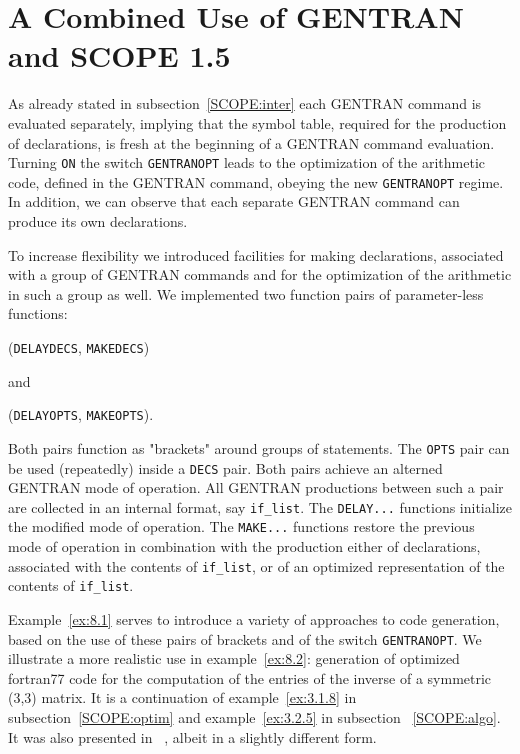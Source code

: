 \section{A Combined Use of GENTRAN and SCOPE 1.5}\label{SCOPE:gopt}

As already stated in subsection~\ref{SCOPE:inter} each GENTRAN command is 
evaluated separately, implying that the symbol table, required 
for the production of declarations, is fresh at the beginning of a GENTRAN 
command evaluation. Turning {\tt ON} the switch {\tt GENTRANOPT} leads to
the optimization of the arithmetic code, defined in  the GENTRAN command,
obeying the new {\tt GENTRANOPT} regime. In addition, we can observe that 
each separate GENTRAN command can produce its own declarations.

To increase flexibility we introduced facilities for making declarations,
associated with a group of GENTRAN commands and for the optimization of
the arithmetic in such a group as well.
We implemented two function pairs of parameter-less functions:

\hspace{1cm} ({\tt DELAYDECS}, {\tt MAKEDECS})

and 

\hspace{1cm} ({\tt DELAYOPTS}, {\tt MAKEOPTS}).

Both pairs function as "brackets" around groups of statements. The {\tt OPTS}
pair can be used (repeatedly) inside a {\tt DECS} pair. Both pairs achieve
an alterned GENTRAN mode of operation. All GENTRAN productions between such
a pair are collected in an internal format, say {\tt if\_list}. 
The {\tt DELAY...} functions initialize the modified mode of operation. 
The {\tt MAKE...} functions restore the previous mode of operation in 
combination with the production either of declarations, associated with the
contents of {\tt if\_list}, or of an optimized representation  of the
contents of {\tt if\_list}.

Example~\ref{ex:8.1} serves to introduce a variety of approaches to code 
generation, based on the use of these pairs of brackets and of the 
switch {\tt GENTRANOPT}. We illustrate a more realistic use in 
example~\ref{ex:8.2}: generation of optimized fortran77 code for the 
computation of the entries of the inverse of a symmetric (3,3) matrix. 
It is a continuation of example~\ref{ex:3.1.8} in 
subsection~\ref{SCOPE:optim} and example~\ref{ex:3.2.5} in 
subsection ~\ref{SCOPE:algo}. It was also presented 
in ~\cite{Gates:85}, albeit in a slightly different form.

